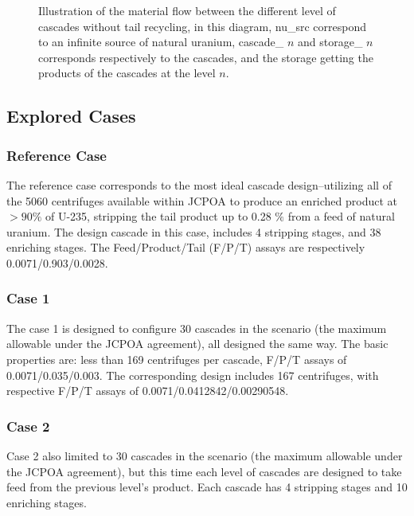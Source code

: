\documentclass{anstrans}
\begin{document}
\begin{figure}[ht]
  \caption{Illustration of the material flow between the different level of
      cascades without tail recycling, in this diagram, nu\_src correspond to an
      infinite source of natural uranium, cascade\_ $n$ and storage\_ $n$
      corresponds respectively to the cascades, and the storage getting the
  products of the cascades at the level $n$.}\label{fig:flow}
\end{figure}

\subsection{Explored Cases}
\subsubsection{Reference Case}

The reference case corresponds to the most ideal cascade design--utilizing all
of the 5060 centrifuges available within JCPOA to produce an enriched product at
$>90\%$ of U-235, stripping the tail product up to 0.28 $\%$ from a feed of
natural uranium.  The design cascade in this case, includes 4 stripping stages,
and 38 enriching stages. The Feed/Product/Tail (F/P/T) assays are respectively
0.0071/0.903/0.0028.

\subsubsection{Case 1}

The case 1 is designed to configure 30 cascades in the scenario (the maximum
allowable under the JCPOA agreement), all designed the same way. The basic
properties are: less than 169 centrifuges per cascade, F/P/T assays of
0.0071/0.035/0.003. The corresponding design includes 167 centrifuges, with
respective F/P/T assays of 0.0071/0.0412842/0.00290548.

\subsubsection{Case 2} 

Case 2 also limited to 30 cascades in the scenario (the maximum allowable under
the JCPOA agreement), but this time each level of cascades are designed to take
feed from the previous level's product. Each cascade has 4 stripping stages and
10 enriching stages. 
\end{document}
